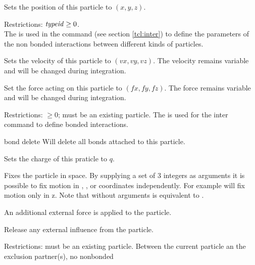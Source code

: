 \begin{arguments}
\item[\var{pid}]
\item[\opt{pos \var{x} \var{y} \var{z}}] Sets the position of this
  particle to $(x,y,z)$.
\item[\opt{type \var{typeid}}] Restrictions:
  $\mathrm{\mathit{typeid}} \geq 0$.\\ The
   is used in the  command
  (see section \vref{tcl:inter}) to define the parameters of the non
  bonded interactions between different kinds of particles.
\item[\opt{v \var{vx} \var{vy} \var{vz}}] Sets the velocity of
this particle to $(vx,vy,vz)$. The velocity remains variable and will be changed
during integration.
\item[\opt{f \var{fx} \var{fy} \var{fz}}] Set the force acting on this particle
to $(fx,fy,fz)$. The force remains variable and will be changed during integration.
\item[\opt{bond \var{bondid} \var{pid2}\dots}]
  Restrictions:  $\geq 0$;  must
  be an existing particle.  The  is used for
  the inter command to define bonded interactions.
\item[bond delete] Will delete all bonds attached to this particle.
\item[\opt{q \var{charge}}] Sets the charge of this praticle to $q$.
\item[\opt{quat \var{q1} \var{q2} \var{q3} \var{q4}}]  
  \item[\opt{omega \var{x} \var{y} \var{z}}]  
  \item[\opt{torque \var{x} \var{y} \var{z}}] 
\item[\opt{fix \var{x} \var{y} \var{z}}] Fixes the particle in space.
  By supplying a set of 3 integers as arguments it is possible to fix
  motion in , , or  coordinates independently. For
  example  will fix motion only in z. Note that
   without arguments is equivalent to .
\item[\opt{ext_force \var{x} \var{y} \var{z}}]
  An additional external force is applied to the particle.
\item[\opt{unfix}] Release any external influence from the particle.
\item[\opt{exclude \var{pid2}\dots+}] Restrictions:
   must be an existing particle.  Between the
  current particle an the exclusion partner(s), no nonbonded

\end{arguments}
